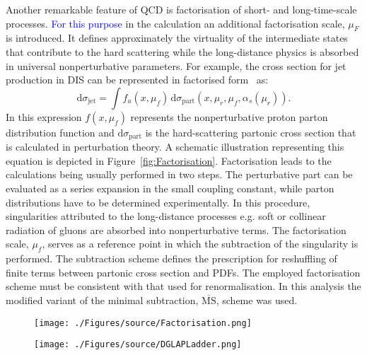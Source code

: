 Another remarkable feature of QCD is factorisation of short- and long-time-scale processes. \textcolor{blue}{For this purpose} in the calculation an additional factorisation scale, $\mu_F$ is introduced. It defines approximately the virtuality of the intermediate states that contribute to the hard scattering while the long-distance physics is absorbed in universal nonperturbative parameters. For example, the cross section for jet production in DIS can be represented in factorised form~\cite{Collins Factorization of Hard Processes in} as:
\begin{equation}
 \mathrm{d}\sigma_{\mathrm{jet}} = \int{f_a\left(x,\mu_f\right)}\, \mathrm{d}\sigma_{\mathrm{part}}\left(x,\mu_r, \mu_f, \alpha_s\left(\mu_r\right) \right).
\label{eq:disfactorisation}
\end{equation} 
In this expression $f\left(x,\mu_f\right)$ represents the nonperturbative proton parton distribution function and $\mathrm{d}\sigma_{\mathrm{part}}$ is the hard-scattering partonic cross section that is calculated in perturbation theory. A schematic illustration representing this equation is depicted in Figure~\ref{fig:Factorisation}. Factorisation leads to the calculations being usually performed in two steps. The perturbative part can be evaluated as a series expansion in the small coupling constant, while parton distributions have to be determined experimentally. In this procedure, singularities attributed to the long-distance processes e.g. soft or collinear radiation of gluons are absorbed into nonperturbative terms. The factorisation scale, $\mu_f$, serves as a reference point in which the subtraction of the singularity is performed. The subtraction scheme defines the prescription for reshuffling of finite terms between partonic cross section and PDFs. The employed factorisation scheme must be consistent with that used for renormalisation. In this analysis the modified variant of the minimal subtraction, $\overline{\mathrm{MS}}$, scheme was used.
\begin{figure}[t]
	\centering
	\begin{subfloat}[]{
		\texttt{[image: ./Figures/source/Factorisation.png]}
		\label{fig:Factorisation}
	 }%
	\end{subfloat}
	\begin{subfloat}[]{
		\texttt{[image: ./Figures/source/DGLAPLadder.png]}
		\label{fig:DGLAPLadder}
	}%
	\end{subfloat}
	\caption{}
\label{fig:factorisationdglapladder}
\end{figure}
